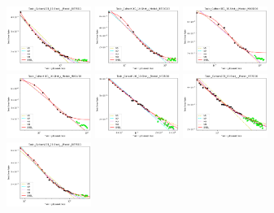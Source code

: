 \documentclass{article} %
\begin{document}
\begin{figure}
\includegraphics[width=0.245\textwidth]{figures/scaling_laws_benchmark_dataset_plots__all_functional_forms/caltech_10shot___BiT_50_1.png}
\includegraphics[width=0.245\textwidth]{figures/scaling_laws_benchmark_dataset_plots__all_functional_forms/caltech_10shot___BiT_101_3.png}
\includegraphics[width=0.245\textwidth]{figures/scaling_laws_benchmark_dataset_plots__all_functional_forms/caltech_10shot___MiX_B_16.png}
\includegraphics[width=0.245\textwidth]{figures/scaling_laws_benchmark_dataset_plots__all_functional_forms/caltech_10shot___MiX_L_16.png}
\includegraphics[width=0.245\textwidth]{figures/scaling_laws_benchmark_dataset_plots__all_functional_forms/caltech_10shot___ViT_B_16.png}
\includegraphics[width=0.245\textwidth]{figures/scaling_laws_benchmark_dataset_plots__all_functional_forms/caltech_10shot___ViT_S_16.png}
\includegraphics[width=0.245\textwidth]{figures/scaling_laws_benchmark_dataset_plots__all_functional_forms/caltech_25shot___BiT_50_1.png}

\end{figure}
\end{document}
